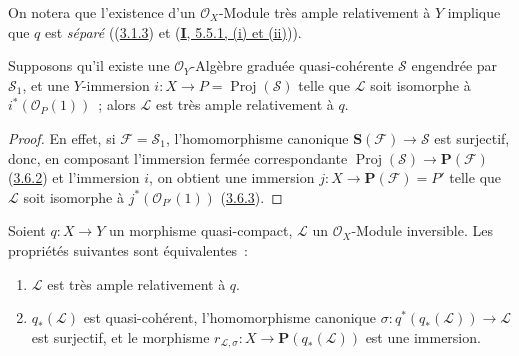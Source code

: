 On notera que l'existence d'un $\mathcal{O}_X$-Module très ample relativement
à $Y$ implique que $q$ est \emph{séparé}
((\hyperref[II.3.1.3-fr]{3.1.3}) et
(\hyperref[I.5.5.1-fr]{\textbf{I}, 5.5.1, (i) et (ii)})).

\begin{corollary}[4.4.3]
\label{II.4.4.3-fr}
Supposons qu'il existe une $\mathcal{O}_Y$-Algèbre graduée quasi-cohérente
$\mathcal{S}$ engendrée par $\mathcal{S}_1$, et une $Y$-immersion
$i:X\to P=\operatorname{Proj}(\mathcal{S})$ telle que $\mathcal{L}$ soit
isomorphe à $i^*(\mathcal{O}_P(1))$~; alors $\mathcal{L}$ est très ample
relativement à $q$.
\end{corollary}

\begin{proof}
En effet, si $\mathcal{F}=\mathcal{S}_1$, l'homomorphisme canonique
$\mathbf{S}(\mathcal{F})\to\mathcal{S}$ est surjectif, donc, en composant
l'immersion fermée correspondante
$\operatorname{Proj}(\mathcal{S})\to\mathbf{P}(\mathcal{F})$
(\hyperref[II.3.6.2-fr]{3.6.2}) et l'immersion $i$, on obtient une immersion
$j:X\to\mathbf{P}(\mathcal{F})=P'$ telle que $\mathcal{L}$ soit isomorphe à
$j^*(\mathcal{O}_{P'}(1))$ (\hyperref[II.3.6.3-fr]{3.6.3}).
\end{proof}

\begin{proposition}[4.4.4]
\label{II.4.4.4-fr}
Soient $q:X\to Y$ un morphisme quasi-compact, $\mathcal{L}$ un
$\mathcal{O}_X$-Module inversible. Les propriétés suivantes sont
équivalentes~:
\begin{enumerate}
  \item[\rm{a)}] $\mathcal{L}$ est très ample relativement à $q$.
  \item[\rm{b)}] $q_*(\mathcal{L})$ est quasi-cohérent, l'homomorphisme
  canonique $\sigma:q^*(q_*(\mathcal{L}))\to\mathcal{L}$ est surjectif, et le
  morphisme
  $r_{\mathcal{L},\sigma}:X\to\mathbf{P}(q_*(\mathcal{L}))$ est une immersion.
\end{enumerate}
\end{proposition}

